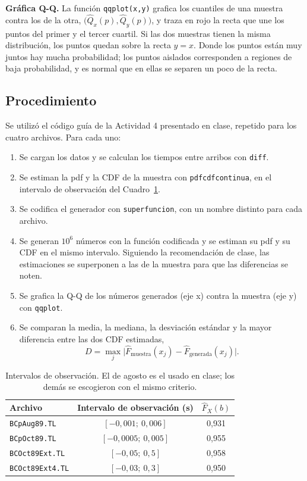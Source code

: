 \documentclass[12pt]{article}
\begin{document}
\textbf{Gráfica Q-Q.} La función \texttt{qqplot(x,y)} grafica los cuantiles de una muestra contra los de la otra, $\bigl(\hat{Q}_x(p),\hat{Q}_y(p)\bigr)$, y traza en rojo la recta que une los puntos del primer y el tercer cuartil. Si las dos muestras tienen la misma distribución, los puntos quedan sobre la recta $y=x$. Donde los puntos están muy juntos hay mucha probabilidad; los puntos aislados corresponden a regiones de baja probabilidad, y es normal que en ellas se separen un poco de la recta.

\subsection{Procedimiento}

Se utilizó el código guía de la Actividad 4 presentado en clase, repetido para los cuatro archivos. Para cada uno:

\begin{enumerate}
    \item Se cargan los datos y se calculan los tiempos entre arribos con \texttt{diff}.
    \item Se estiman la pdf y la CDF de la muestra con \texttt{pdfcdfcontinua}, en el intervalo de observación del Cuadro~\ref{tab:intervalos}.
    \item Se codifica el generador con \texttt{superfuncion}, con un nombre distinto para cada archivo.
    \item Se generan $10^6$ números con la función codificada y se estiman su pdf y su CDF en el mismo intervalo. Siguiendo la recomendación de clase, las estimaciones se superponen a las de la muestra para que las diferencias se noten.
    \item Se grafica la Q-Q de los números generados (eje x) contra la muestra (eje y) con \texttt{qqplot}.
    \item Se comparan la media, la mediana, la desviación estándar y la mayor diferencia entre las dos CDF estimadas,
    \[
    D=\max_j\bigl|\hat{F}_{\text{muestra}}(x_j)-\hat{F}_{\text{generada}}(x_j)\bigr|.
    \]
\end{enumerate}

\begin{table}[!htbp]
\centering
\begin{tabular}{l c c}
\hline
Archivo & Intervalo de observación (s) & $\hat{F}_X(b)$ \\
\hline
\texttt{BCpAug89.TL}    & $[-0{,}001;\ 0{,}006]$  & 0,931 \\
\texttt{BCpOct89.TL}    & $[-0{,}0005;\ 0{,}005]$ & 0,955 \\
\texttt{BCOct89Ext.TL}  & $[-0{,}05;\ 0{,}5]$     & 0,958 \\
\texttt{BCOct89Ext4.TL} & $[-0{,}03;\ 0{,}3]$     & 0,950 \\
\hline
\end{tabular}
\caption{Intervalos de observación. El de agosto es el usado en clase; los demás se escogieron con el mismo criterio.}
\label{tab:intervalos}
\end{table}
\end{document}
